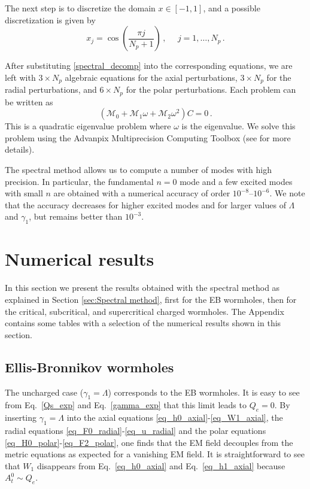 \documentclass[11pt,a4paper]{article}
\begin{document}
The next step is to discretize the domain $x\in\left[-1,1\right]$, and a possible discretization is given by
%
\begin{equation}
    x_j=\cos{\left(\frac{\pi j}{N_p+1}\right)} \,,\:\:\:\:\:\: j=1,\dots,N_p \,.
\end{equation}
%

After substituting \eqref{spectral_decomp} into the corresponding equations, we are left with $3\times N_p$ algebraic equations for the axial perturbations, $3\times N_p$ for the radial perturbations, and $6\times N_p$ for the polar perturbations. 
Each problem can be written as
%
\begin{equation}
    \left(\mathcal{M}_0+\mathcal{M}_1\omega+\mathcal{M}_2\omega^2\right)C=0 \,.
\end{equation}
%
This is a quadratic eigenvalue problem where $\omega$ is the eigenvalue. 
We solve this problem using the Advanpix Multiprecision Computing Toolbox \cite{Advanpix} (see \cite{Khoo:2024yeh,Blazquez-Salcedo:2023hwg,Blazquez-Salcedo:2024oek, Blazquez-Salcedo:2024dur} for more details). 

The spectral method allows us to compute a number of modes with high precision.
In particular, the fundamental $n=0$ mode and a few excited modes with small $n$ are obtained with a numerical accuracy of order $10^{-8}$--$10^{-6}$.
We note that the accuracy decreases for higher excited modes and for larger values of $\Lambda$ and $\gamma_1$, but remains better than $10^{-3}$.


\section{Numerical results}
\label{sec:NumericalResults}


In this section we present the results obtained with the spectral method as explained in Section \ref{sec:Spectral method},
first for the EB wormholes, then for the critical, subcritical, and supercritical charged wormholes.
The Appendix contains some tables with a selection of the numerical results shown in this section.

\subsection{Ellis-Bronnikov wormholes}

The uncharged case ($\gamma_1=\Lambda$) corresponds to the EB wormholes. 
It is easy to see from Eq.~\eqref{Qs_exp} and Eq.~\eqref{gamma_exp} that this limit leads to $Q_e=0$. 
By inserting $\gamma_1=\Lambda$ into the axial equations \eqref{eq_h0_axial}-\eqref{eq_W1_axial}, the radial equations \eqref{eq_F0_radial}-\eqref{eq_u_radial} and the polar equations \eqref{eq_H0_polar}-\eqref{eq_F2_polar}, one finds that the EM field decouples from the metric equations as expected for a vanishing EM field. 
It is straightforward to see that $W_1$ disappears from Eq.~\eqref{eq_h0_axial} and Eq.~\eqref{eq_h1_axial} because $A^0_t\sim Q_e$. 
\end{document}
